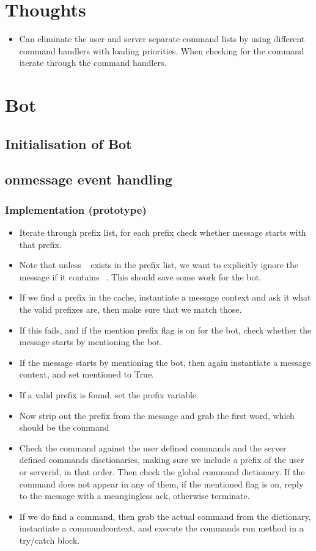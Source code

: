 \documentclass[a4paper]{amsart}
\begin{document}
\section{Thoughts}
\begin{itemize}
    \item Can eliminate the user and server separate command lists by using different command handlers with loading priorities. When checking for the command iterate through the command handlers.
\end{itemize}

\section{Bot}

\subsection{Initialisation of Bot}
\subsection{onmessage event handling}
    \subsubsection{Implementation (prototype)}
        \begin{itemize}
            \item Iterate through prefix list, for each prefix check whether message starts with that prefix.
            \item Note that unless $~~$ exists in the prefix list, we want to explicitly ignore the message if it contains $~~$. This should save some work for the bot.
            \item If we find a prefix in the cache, instantiate a message context and ask it what the valid prefixes are, then make sure that we match those.
            \item If this fails, and if the mention prefix flag is on for the bot, check whether the message starts by mentioning the bot.
            \item If the message starts by mentioning the bot, then again instantiate a message context, and set mentioned to True.
            \item If a valid prefix is found, set the prefix variable.
            \item Now strip out the prefix from the message and grab the first word, which should be the command
            \item Check the command against the user defined commands and the server defined commands disctionaries, making sure we include a prefix of the user or serverid, in that order. Then check the global command dictionary. If the command does not appear in any of them, if the mentioned flag is on, reply to the message with a meangingless ack, otherwise terminate.
            \item If we do find a command, then grab the actual command from the dictionary, instantiate a commandcontext, and execute the commands run method in a try/catch block.
        \end{itemize}
\end{document}
